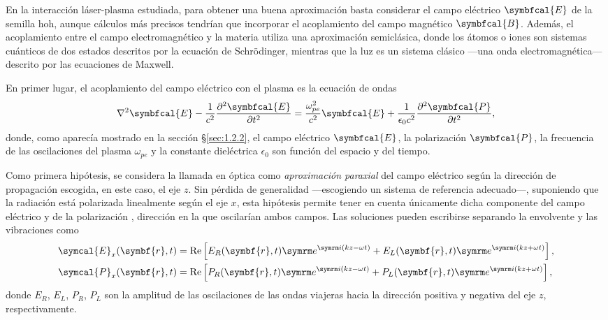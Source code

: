 En la interacción láser-plasma estudiada, para obtener una buena aproximación basta considerar el campo eléctrico $\symbfcal{E}$ de la semilla \acrshort{hoh}, aunque cálculos más precisos tendrían que incorporar el acoplamiento del campo magnético $\symbfcal{B}$. Además, el acoplamiento entre el campo electromagnético y la materia utiliza una aproximación semiclásica, donde los átomos o iones son sistemas cuánticos de dos estados descritos por la ecuación de Schrödinger, mientras que la luz es un sistema clásico ---una onda electromagnética--- descrito por las ecuaciones de Maxwell. 

En primer lugar, el acoplamiento del campo eléctrico con el plasma es la ecuación de ondas 
\begin{equation}\label{eq:3.0}
  \laplacian \symbfcal{E} - \frac{1}{c^{2}}\pdvN{\symbfcal{E}}{t}{2} = \frac{\omega^{2}_{pe}}{c^{2}}\symbfcal{E} + \frac{1}{\epsilon_{0}c^{2}}\pdvN{\symbfcal{P}}{t}{2},
\end{equation}
donde, como aparecía mostrado en la sección \S\ref{sec:1.2.2}, el campo eléctrico $\symbfcal{E}$, la polarización $\symbfcal{P}$, la frecuencia de las oscilaciones del plasma $\omega_{pe}$ y la constante dieléctrica $\epsilon_{0}$ son función del espacio y del tiempo. 

Como primera hipótesis, se considera la llamada en óptica\autocite{Born2019} como \emph{aproximación paraxial} del campo eléctrico según la dirección de propagación escogida, en este caso, el eje $z$. Sin pérdida de generalidad ---escogiendo un sistema de referencia adecuado---, suponiendo que la radiación está polarizada linealmente según el eje $x$, esta hipótesis permite tener en cuenta únicamente dicha componente del campo eléctrico y de la polarización \autocite{Larroche2000}, dirección en la que oscilarían ambos campos. Las soluciones pueden escribirse separando la envolvente y las vibraciones como
\begin{align}
  \label{eq:3.1a}
  \symcal{E}_{x}(\symbf{r},t) &= \RE \left[E_{R}(\symbf{r},t)\eu^{\iu (kz - \omega t)} + E_{L}(\symbf{r},t)\eu^{\iu (kz + \omega t)}\right], \\
  \label{eq:3.1b}
  \symcal{P}_{x}(\symbf{r},t) &= \RE \left[P_{R}(\symbf{r},t)\eu^{\iu (kz - \omega t)} + P_{L}(\symbf{r},t)\eu^{\iu (kz + \omega t)}\right], 
\end{align}
donde $E_{R}$, $E_{L}$, $P_{R}$, $P_{L}$ son la amplitud de las oscilaciones de las ondas viajeras hacia la dirección positiva y negativa del eje $z$, respectivamente. 

